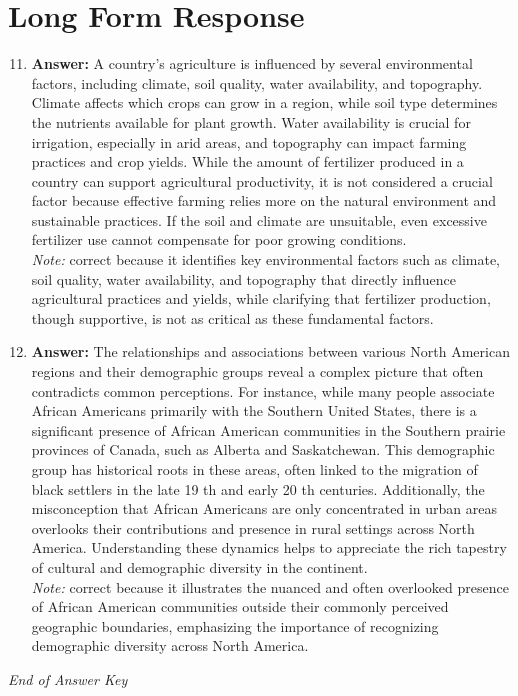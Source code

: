 \documentclass[12pt]{article}
\begin{document}
\section*{Long Form Response}
\begin{enumerate}[label=\arabic*.]
\setcounter{enumi}{10}
\item \textbf{Answer:} A country's agriculture is influenced by several environmental factors, including climate, soil quality, water availability, and topography. Climate affects which crops can grow in a region, while soil type determines the nutrients available for plant growth. Water availability is crucial for irrigation, especially in arid areas, and topography can impact farming practices and crop yields. While the amount of fertilizer produced in a country can support agricultural productivity, it is not considered a crucial factor because effective farming relies more on the natural environment and sustainable practices. If the soil and climate are unsuitable, even excessive fertilizer use cannot compensate for poor growing conditions.
\\ \textit{Note:} correct because it identifies key environmental factors such as climate, soil quality, water availability, and topography that directly influence agricultural practices and yields, while clarifying that fertilizer production, though supportive, is not as critical as these fundamental factors.
\item \textbf{Answer:} The relationships and associations between various North American regions and their demographic groups reveal a complex picture that often contradicts common perceptions. For instance, while many people associate African Americans primarily with the Southern United States, there is a significant presence of African American communities in the Southern prairie provinces of Canada, such as Alberta and Saskatchewan. This demographic group has historical roots in these areas, often linked to the migration of black settlers in the late 19 th and early 20 th centuries. Additionally, the misconception that African Americans are only concentrated in urban areas overlooks their contributions and presence in rural settings across North America. Understanding these dynamics helps to appreciate the rich tapestry of cultural and demographic diversity in the continent.
\\ \textit{Note:} correct because it illustrates the nuanced and often overlooked presence of African American communities outside their commonly perceived geographic boundaries, emphasizing the importance of recognizing demographic diversity across North America.
\end{enumerate}

\vfill
\noindent\textit{End of Answer Key}
\end{document}

